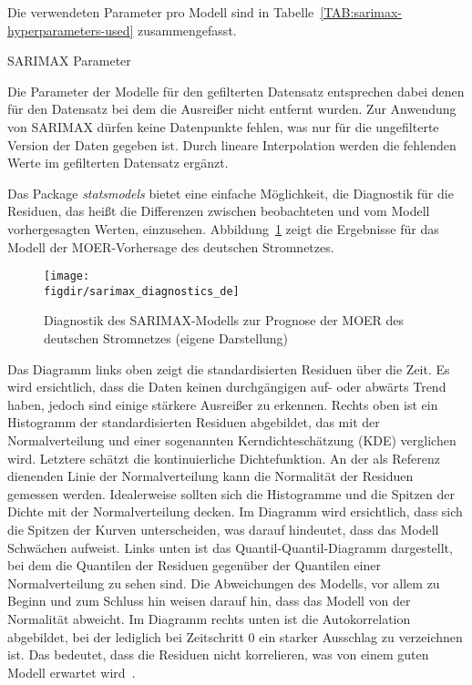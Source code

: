 Die verwendeten Parameter pro Modell sind in Tabelle~\ref{TAB:sarimax-hyperparameters-used} zusammengefasst.
\begin{table}[t]
 \centering\small
 \caption{SARIMAX Parameter}
 \label{TAB:sarimax-hyperparameters-used}
 
\end{table}

Die Parameter der Modelle für den gefilterten Datensatz entsprechen dabei denen für den Datensatz bei dem die Ausreißer nicht entfernt wurden.
Zur Anwendung von \ac{SARIMAX} dürfen keine Datenpunkte fehlen, was nur für die ungefilterte Version der Daten gegeben ist.
Durch lineare Interpolation werden die fehlenden Werte im gefilterten Datensatz ergänzt.

Das Package \textit{statsmodels} bietet eine einfache Möglichkeit, die Diagnostik für die Residuen, das heißt die Differenzen zwischen beobachteten und vom Modell vorhergesagten Werten, einzusehen.
Abbildung~\ref{FIG:sarimax_diagnostics_de} zeigt die Ergebnisse für das Modell der \ac{MOER}-Vorhersage des deutschen Stromnetzes.
\begin{figure}
 \caption[SARIMAX Diagnostik MOER Deutschland]{Diagnostik des SARIMAX-Modells zur Prognose der MOER des deutschen Stromnetzes (eigene Darstellung)}
 {\texttt{[image: \\figdir/sarimax\_diagnostics\_de]}}
 \label{FIG:sarimax_diagnostics_de}
\end{figure}
Das Diagramm links oben zeigt die standardisierten Residuen über die Zeit.
Es wird ersichtlich, dass die Daten keinen durchgängigen auf- oder abwärts Trend haben, jedoch sind einige stärkere Ausreißer zu erkennen.
Rechts oben ist ein Histogramm der standardisierten Residuen abgebildet, das mit der Normalverteilung und einer sogenannten Kerndichteschätzung (KDE) verglichen wird.
Letztere schätzt die kontinuierliche Dichtefunktion.
An der als Referenz dienenden Linie der Normalverteilung kann die Normalität der Residuen gemessen werden.
Idealerweise sollten sich die Histogramme und die Spitzen der Dichte mit der Normalverteilung decken.
Im Diagramm wird ersichtlich, dass sich die Spitzen der Kurven unterscheiden, was darauf hindeutet, dass das Modell Schwächen aufweist.
Links unten ist das Quantil-Quantil-Diagramm dargestellt, bei dem die Quantilen der Residuen gegenüber der Quantilen einer Normalverteilung zu sehen sind.
Die Abweichungen des Modells, vor allem zu Beginn und zum Schluss hin weisen darauf hin, dass das Modell von der Normalität abweicht.
Im Diagramm rechts unten ist die Autokorrelation abgebildet, bei der lediglich bei Zeitschritt 0 ein starker Ausschlag zu verzeichnen ist.
Das bedeutet, dass die Residuen nicht korrelieren, was von einem guten Modell erwartet wird~\cite{Peixeiro.2022}.

